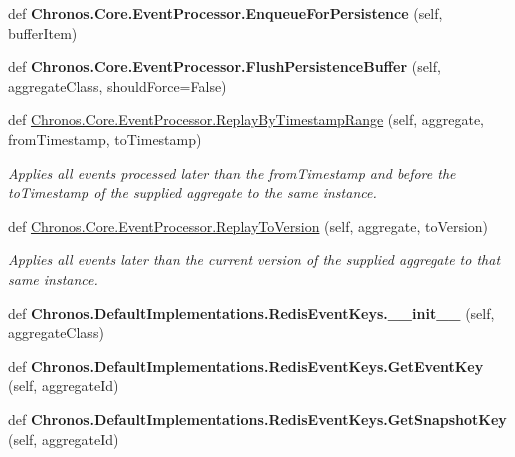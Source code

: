 \begin{DoxyCompactItemize}
\item 
def {\bfseries Chronos.\+Core.\+Event\+Processor.\+Enqueue\+For\+Persistence} (self, buffer\+Item)\hypertarget{group__Chronos_ga40a1c85e578a7f97c032c3a3874cc9ab}{}\label{group__Chronos_ga40a1c85e578a7f97c032c3a3874cc9ab}

\item 
def {\bfseries Chronos.\+Core.\+Event\+Processor.\+Flush\+Persistence\+Buffer} (self, aggregate\+Class, should\+Force=False)\hypertarget{group__Chronos_gafa730892bdc60b511155819c810ee034}{}\label{group__Chronos_gafa730892bdc60b511155819c810ee034}

\item 
def \hyperlink{group__Chronos_gab6aa538a4b382256b1b168a274adab7f}{Chronos.\+Core.\+Event\+Processor.\+Replay\+By\+Timestamp\+Range} (self, aggregate, from\+Timestamp, to\+Timestamp)\hypertarget{group__Chronos_gab6aa538a4b382256b1b168a274adab7f}{}\label{group__Chronos_gab6aa538a4b382256b1b168a274adab7f}

\begin{DoxyCompactList}\small\item\em Applies all events processed later than the from\+Timestamp and before the to\+Timestamp of the supplied aggregate to the same instance. \end{DoxyCompactList}\item 
def \hyperlink{group__Chronos_gae2b807dba975704f1e383eef0df911c6}{Chronos.\+Core.\+Event\+Processor.\+Replay\+To\+Version} (self, aggregate, to\+Version)
\begin{DoxyCompactList}\small\item\em Applies all events later than the current version of the supplied aggregate to that same instance. \end{DoxyCompactList}\item 
def {\bfseries Chronos.\+Default\+Implementations.\+Redis\+Event\+Keys.\+\_\+\+\_\+init\+\_\+\+\_\+} (self, aggregate\+Class)\hypertarget{group__Chronos_ga1f2dc9aa11e9380406bbeca9f84dee3a}{}\label{group__Chronos_ga1f2dc9aa11e9380406bbeca9f84dee3a}

\item 
def {\bfseries Chronos.\+Default\+Implementations.\+Redis\+Event\+Keys.\+Get\+Event\+Key} (self, aggregate\+Id)\hypertarget{group__Chronos_ga10b50c56d334d5c87927f4da85163afa}{}\label{group__Chronos_ga10b50c56d334d5c87927f4da85163afa}

\item 
def {\bfseries Chronos.\+Default\+Implementations.\+Redis\+Event\+Keys.\+Get\+Snapshot\+Key} (self, aggregate\+Id)\hypertarget{group__Chronos_ga11ac7909bf6f1c51ea9280f483fd81c4}{}\label{group__Chronos_ga11ac7909bf6f1c51ea9280f483fd81c4}


\end{DoxyCompactItemize}
